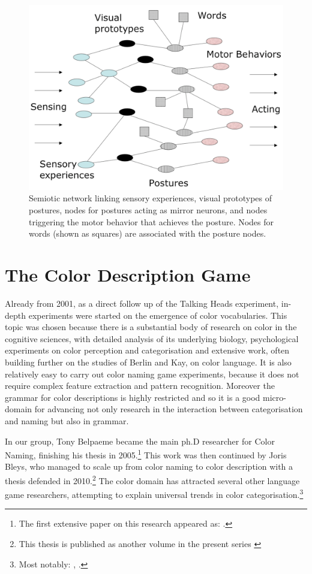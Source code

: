 \begin{figure}
\centerline{\includegraphics[width=0.6\linewidth]{chap11/figs/network}}
\caption{ \label{network} Semiotic network linking sensory experiences, visual prototypes of postures, nodes for postures acting as mirror neurons, and nodes triggering the motor behavior that achieves the posture. Nodes for words (shown as squares) 
are associated with the posture nodes.}
\end{figure}

\section{The Color Description Game}

Already from 2001, as a direct follow up of the Talking Heads experiment, in-depth experiments were started on the emergence of 
color vocabularies. This topic was chosen because 
there is a substantial body of research on color in the cognitive sciences, with 
detailed analysis of its underlying biology, psychological experiments on color perception and categorisation 
and extensive work, often building further on the studies of Berlin and Kay, on color language. It is also 
relatively easy to carry out color naming game experiments, because it does not require complex feature extraction 
and pattern recognition. Moreover the grammar for color descriptions is highly restricted and so it is a good micro-domain for 
advancing not only research in the interaction between categorisation and naming but also in grammar. 

In our group, Tony Belpaeme became the main ph.D researcher for Color Naming, finishing his thesis 
in 2005.\footnote{The first extensive paper on this research appeared as: \cite{Steels:2005}.}
This work was then continued by Joris Bleys, who managed to scale up from color naming to color description with 
a thesis defended in 2010.\footnote{This thesis is published as another volume in the present series \cite{Bleys:2014}}
The color domain has attracted several other language game researchers, attempting to explain 
universal trends in color categorisation.\footnote{Most notably: \cite{Puglisi:2008}, \cite{Baronchelli:2010}.}


